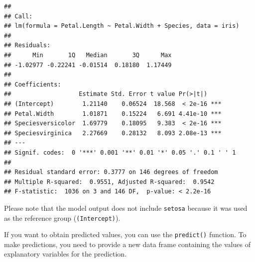 \documentclass[
]{book}
\newenvironment{Shaded}{\begin{snugshade}}{\end{snugshade}}
\newcommand{\AttributeTok}[1]{\textcolor[rgb]{0.77,0.63,0.00}{#1}}
\newcommand{\CommentTok}[1]{\textcolor[rgb]{0.56,0.35,0.01}{\textit{#1}}}
\newcommand{\DecValTok}[1]{\textcolor[rgb]{0.00,0.00,0.81}{#1}}
\newcommand{\FunctionTok}[1]{\textcolor[rgb]{0.00,0.00,0.00}{#1}}
\newcommand{\NormalTok}[1]{#1}
\newcommand{\OtherTok}[1]{\textcolor[rgb]{0.56,0.35,0.01}{#1}}
\newcommand{\SpecialCharTok}[1]{\textcolor[rgb]{0.00,0.00,0.00}{#1}}
\begin{document}
\begin{verbatim}
## 
## Call:
## lm(formula = Petal.Length ~ Petal.Width + Species, data = iris)
## 
## Residuals:
##      Min       1Q   Median       3Q      Max 
## -1.02977 -0.22241 -0.01514  0.18180  1.17449 
## 
## Coefficients:
##                   Estimate Std. Error t value Pr(>|t|)    
## (Intercept)        1.21140    0.06524  18.568  < 2e-16 ***
## Petal.Width        1.01871    0.15224   6.691 4.41e-10 ***
## Speciesversicolor  1.69779    0.18095   9.383  < 2e-16 ***
## Speciesvirginica   2.27669    0.28132   8.093 2.08e-13 ***
## ---
## Signif. codes:  0 '***' 0.001 '**' 0.01 '*' 0.05 '.' 0.1 ' ' 1
## 
## Residual standard error: 0.3777 on 146 degrees of freedom
## Multiple R-squared:  0.9551, Adjusted R-squared:  0.9542 
## F-statistic:  1036 on 3 and 146 DF,  p-value: < 2.2e-16
\end{verbatim}

Please note that the model output does not include \texttt{setosa} because it was used as the reference group (\texttt{(Intercept)}).

If you want to obtain predicted values, you can use the \texttt{predict()} function. To make predictions, you need to provide a new data frame containing the values of explanatory variables for the prediction.

\begin{Shaded}
\end{Shaded}
\end{document}
